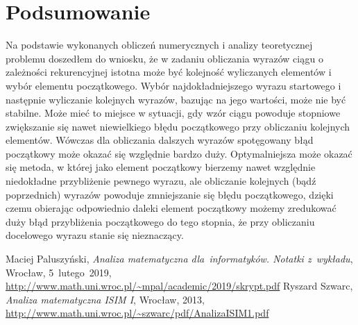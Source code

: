 \documentclass[11pt,wide]{article}
\begin{document}
\section{Podsumowanie}
Na podstawie wykonanych obliczeń numerycznych i analizy teoretycznej problemu doszedłem do wniosku, że w zadaniu obliczania wyrazów ciągu o zależności rekurencyjnej istotna może być kolejność wyliczanych elementów i wybór elementu początkowego. Wybór najdokładniejszego wyrazu startowego i następnie wyliczanie kolejnych wyrazów, bazując na jego wartości, może nie być stabilne. Może mieć to miejsce w sytuacji, gdy wzór ciągu powoduje stopniowe zwiększanie się nawet niewielkiego błędu początkowego przy obliczaniu kolejnych elementów. Wówczas dla obliczania dalszych wyrazów spotęgowany błąd początkowy może okazać się względnie bardzo duży. Optymalniejsza może okazać się metoda, w której jako element początkowy bierzemy nawet względnie niedokładne przybliżenie pewnego wyrazu, ale obliczanie kolejnych (bądź poprzednich) wyrazów powoduje zmniejszanie się błędu początkowego, dzięki czemu obierając odpowiednio daleki element początkowy możemy zredukować duży błąd przybliżenia początkowego do tego stopnia, że przy obliczaniu docelowego wyrazu stanie się nieznaczący.


\begin{thebibliography}{10}
 Maciej Paluszyński,
\emph{Analiza matematyczna dla~informatyków. Notatki z~wykładu},
Wrocław, 5~lutego~2019, \url{http://www.math.uni.wroc.pl/~mpal/academic/2019/skrypt.pdf}
 Ryszard Szwarc,
\emph{Analiza matematyczna ISIM I},
Wrocław, 2013, \url{http://www.math.uni.wroc.pl/~szwarc/pdf/AnalizaISIM1.pdf}
\end{thebibliography}
\end{document}

